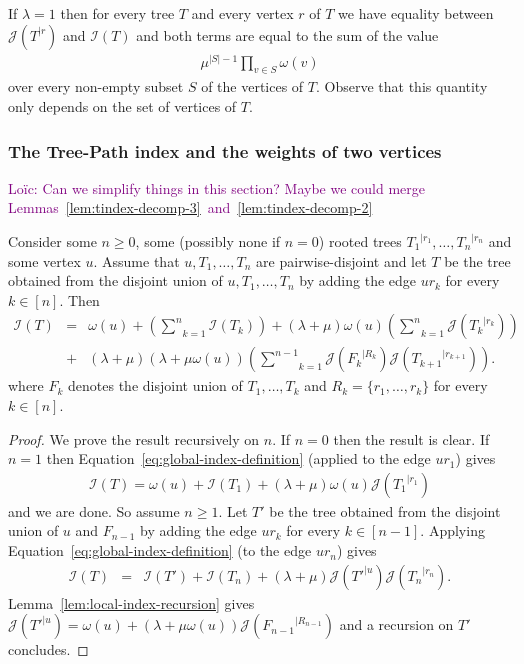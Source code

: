 \documentclass[11 pt]{modarticle}
\newcommand{\wmap}{\omega}
\newcommand{\size}[1]{|#1|}
\newcommand{\rtree}[2]{{#1}^{\lvert #2}}
\newcommand{\indexsymbol}{\mathcal{I}}
\newcommand{\tindex}[1]{\indexsymbol(#1)}
\newcommand{\rindexsymbol}{\mathcal{J}}
\newcommand{\rindex}[2]{\rindexsymbol(\rtree{#2}{#1})}
\newcommand{\ldcomment}[1]{\textcolor{purple}{{\footnotesize Loïc:} #1}}
\begin{document}
\begin{rem}\label{rem:degenerate}
If $\lambda = 1$ then for every tree $T$ and every vertex $r$ of $T$ we have equality between $\rindex{r}{T}$ and $\tindex{T}$ and both terms are equal to the sum of the value
\begin{eqnarray*}
	\mu^{\size{S}-1} \underset{v \in S}{\prod} \wmap(v)
\end{eqnarray*}
over every non-empty subset $S$ of the vertices of $T$. Observe that this quantity only depends on the set of vertices of $T$.
\end{rem}

\subsubsection{The Tree-Path index and the weights of two vertices}

\ldcomment{Can we simplify things in this section? Maybe we could merge Lemmas~\ref{lem:tindex-decomp-3}~and~\ref{lem:tindex-decomp-2}}

\begin{lem}\label{lem:tindex-decomp-1}
Consider some $n \geq 0$, some (possibly none if $n=0$) rooted trees $\rtree{T_1}{r_1}, \dots, \rtree{T_n}{r_n}$ and some vertex $u$. Assume that $u, T_1, \dots, T_n$ are pairwise-disjoint and let $T$ be the tree obtained from the disjoint union of $u, T_1, \dots, T_n$ by adding the edge $u r_k$ for every $k \in [n]$. Then
\begin{eqnarray*}
	\tindex{T} & = & \wmap(u) + \left(\underset{k=1}{\overset{n}{\sum}} \tindex{T_k}\right) + (\lambda + \mu)\wmap(u)\left(\underset{k=1}{\overset{n}{\sum}}\rindex{r_k}{T_k}\right) \\
	& + & (\lambda + \mu)(\lambda + \mu \wmap(u))\left(\underset{k=1}{\overset{n-1}{\sum}}\rindex{R_k}{F_k}\rindex{r_{k+1}}{T_{k+1}}\right).
\end{eqnarray*}
where $F_k$ denotes the disjoint union of $T_1, \dots, T_k$ and $R_k = \{r_1, \dots, r_k\}$ for every $k \in [n]$.
\end{lem}

\begin{proof}
We prove the result recursively on $n$. If $n = 0$ then the result is clear. If $n = 1$ then Equation~\eqref{eq:global-index-definition} (applied to the edge $u r_1$) gives
\begin{eqnarray*}
	\tindex{T} = \wmap(u) + \tindex{T_1} + (\lambda + \mu)\wmap(u) \rindex{r_1}{T_1}
\end{eqnarray*}
and we are done. So assume $n \geq 1$. Let $T'$ be the tree obtained from the disjoint union of $u$ and $F_{n-1}$ by adding the edge $u r_k$ for every $k \in [n-1]$. Applying Equation~\eqref{eq:global-index-definition} (to the edge $u r_n$) gives
\begin{eqnarray*}
	\tindex{T} & = & \tindex{T'} + \tindex{T_n} + (\lambda + \mu) \rindex{u}{T'} \rindex{r_n}{T_n}.
\end{eqnarray*}
Lemma~\ref{lem:local-index-recursion} gives $\rindex{u}{T'} = \wmap(u) + (\lambda + \mu \wmap(u)) \rindex{R_{n-1}}{F_{n-1}}$ and a recursion on $T'$ concludes.
\end{proof}
\end{document}
